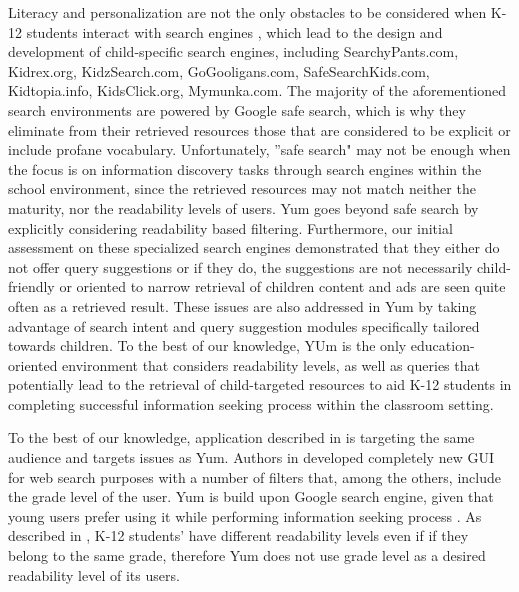 \documentclass{sig-alternate-05-2015}
\begin{document}
Literacy and personalization are not the only obstacles to be considered when K-12 students interact with search engines \cite{Cas11, Wil07, Sch98, Wan05}, which lead to the design and development of child-specific search engines, including SearchyPants.com, Kidrex.org, KidzSearch.com, GoGooligans.com, SafeSearchKids.com, Kidtopia.info, KidsClick.org, Mymunka.com. The majority of the aforementioned search environments are powered by Google safe search, which is why they eliminate from their retrieved resources those that are considered to be explicit or include profane vocabulary. Unfortunately, ''safe search" may not be enough when the focus is on information discovery tasks through search engines within the school environment, since the retrieved resources may not match neither the maturity, nor the readability levels of users. Yum goes beyond safe search by explicitly considering readability based filtering. Furthermore, our initial assessment on these specialized search engines demonstrated that they either do not offer query suggestions or if they do, the suggestions are not necessarily child-friendly or oriented to narrow retrieval of children content and ads are seen quite often as a retrieved result. These issues are also addressed in Yum by taking advantage of search intent and query suggestion modules specifically tailored towards children. To the best of our knowledge, YUm is the only education-oriented environment that considers readability levels, as well as queries that potentially lead to the retrieval of child-targeted resources to aid K-12 students in completing successful information seeking process within the classroom setting.

To the best of our knowledge, application described in \cite{Ust14} is targeting the same audience and targets issues as Yum. Authors in \cite{Ust14} developed completely new GUI for web search purposes with a number of filters that, among the others, include the grade level of the user.  Yum is build upon Google search engine, given that young users prefer using it while performing information seeking process \cite{ref}. As described in \cite{ref2}, K-12 students' have different readability levels even if if they belong to the same grade, therefore Yum does not use grade level as a desired readability level of its users.
\end{document}

